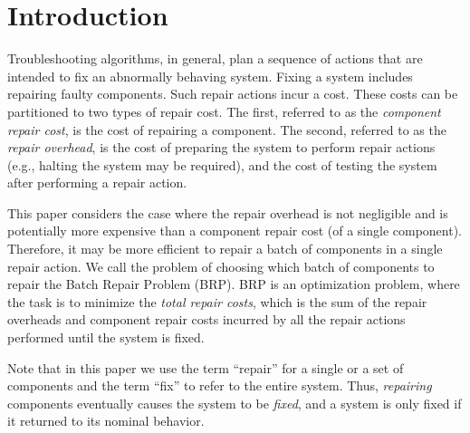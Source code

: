 \section{Introduction}
Troubleshooting algorithms, in general, plan a sequence of actions that are intended to fix an abnormally behaving system. Fixing a system includes repairing faulty components. Such repair actions incur a cost. These costs can be partitioned to two types of repair cost. The first, referred to as the {\em component repair cost}, is the cost of repairing a component. The second, referred to as the {\em repair overhead}, is the cost of preparing the system to perform repair actions (e.g., halting the system may be required), and the cost of testing the system after performing a repair action.

This paper considers the case where the repair overhead is not negligible and is potentially more expensive than a component repair cost (of a single component). Therefore, it may be more efficient to repair a batch of components in a single repair action. We call the problem of choosing which batch of components to repair the Batch Repair Problem (BRP). BRP is an optimization problem, where the task is to minimize the {\em total repair costs}, which is the sum of the repair overheads and component repair costs incurred by all the repair actions performed until the system is fixed.

Note that in this paper we use the term ``repair'' for a single or a set of components and the term ``fix'' to refer to the entire system.  Thus, {\em repairing} components eventually causes the system to be {\em fixed}, and a system is only fixed if it returned to its nominal behavior.



